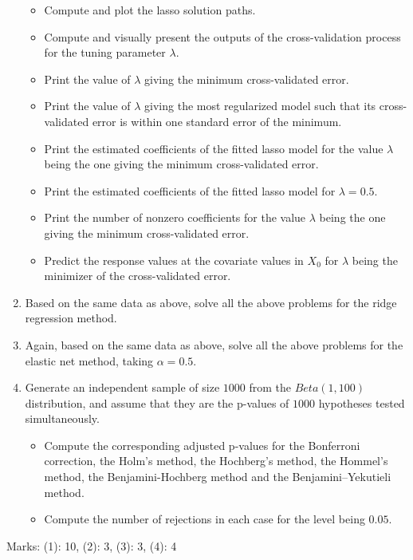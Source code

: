 \documentclass[
]{book}
\begin{document}
\begin{enumerate}
  \begin{itemize}
  \item
    Compute and plot the lasso solution paths.
  \item
    Compute and visually present the outputs of the cross-validation process for the tuning parameter \(\lambda\).
  \item
    Print the value of \(\lambda\) giving the minimum cross-validated error.
  \item
    Print the value of \(\lambda\) giving the most regularized model such that its cross-validated error is within one standard error of the minimum.
  \item
    Print the estimated coefficients of the fitted lasso model for the value \(\lambda\) being the one giving the minimum cross-validated error.
  \item
    Print the estimated coefficients of the fitted lasso model for \(\lambda = 0.5\).
  \item
    Print the number of nonzero coefficients for the value \(\lambda\) being the one giving the minimum cross-validated error.
  \item
    Predict the response values at the covariate values in \(X_0\) for \(\lambda\) being the minimizer of the cross-validated error.
  \end{itemize}
\item
  Based on the same data as above, solve all the above problems for the ridge regression method.
\item
  Again, based on the same data as above, solve all the above problems for the elastic net method, taking \(\alpha = 0.5\).
\item
  Generate an independent sample of size \(1000\) from the \(Beta(1, 100)\) distribution, and assume that they are the p-values of \(1000\) hypotheses tested simultaneously.

  \begin{itemize}
  \item
    Compute the corresponding adjusted p-values for the Bonferroni correction, the Holm's method, the Hochberg's method, the Hommel's method, the Benjamini-Hochberg method and the Benjamini--Yekutieli method.
  \item
    Compute the number of rejections in each case for the level being \(0.05\).
  \end{itemize}
\end{enumerate}

Marks: (1): 10, (2): 3, (3): 3, (4): 4

  
\end{document}
